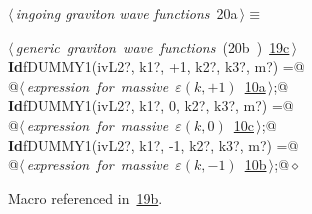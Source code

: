 \documentclass[a4paper,12pt]{amsart}
\renewcommand{\NWtarget}[2]{\hypertarget{#1}{#2}}
\renewcommand{\NWlink}[2]{\hyperlink{#1}{#2}}
\renewcommand{\NWtxtMacroRefIn}{Macro referenced in}
\renewcommand{\NWsep}{${\diamond}$}
\begin{document}
\begin{flushleft} \small
\begin{minipage}{\linewidth}\label{scrap42}\raggedright\small
\NWtarget{nuweb20a}{} $\langle\,${\itshape ingoing graviton wave functions}\nobreak\ {\footnotesize {20a}}$\,\rangle\equiv$
\vspace{-1ex}
\begin{list}{}{} \item
\mbox{}\verb@@\hbox{$\langle\,${\itshape generic graviton wave functions}\nobreak\ ({\footnotesize 20b\label{scrap43}
 }\mbox{}\verb@inp@ ) {\footnotesize \NWlink{nuweb19c}{19c}}$\,\rangle$}\verb@@\\
\mbox{}\verb@@\hbox{\sffamily\bfseries Id}\verb@ fDUMMY1(ivL2?, k1?, +1, k2?, k3?, m?) =@\\
\mbox{}\verb@   @\hbox{$\langle\,${\itshape expression for massive $\varepsilon(k, +1)$}\nobreak\ {\footnotesize \NWlink{nuweb10a}{10a}}$\,\rangle$}\verb@;@\\
\mbox{}\verb@@\hbox{\sffamily\bfseries Id}\verb@ fDUMMY1(ivL2?, k1?, 0, k2?, k3?, m?) =@\\
\mbox{}\verb@   @\hbox{$\langle\,${\itshape expression for massive $\varepsilon(k, 0)$}\nobreak\ {\footnotesize \NWlink{nuweb10c}{10c}}$\,\rangle$}\verb@;@\\
\mbox{}\verb@@\hbox{\sffamily\bfseries Id}\verb@ fDUMMY1(ivL2?, k1?, -1, k2?, k3?, m?) =@\\
\mbox{}\verb@   @\hbox{$\langle\,${\itshape expression for massive $\varepsilon(k, -1)$}\nobreak\ {\footnotesize \NWlink{nuweb10b}{10b}}$\,\rangle$}\verb@;@{\NWsep}
\end{list}
\vspace{-1.5ex}
\footnotesize
\begin{list}{}{\setlength{\itemsep}{-\parsep}\setlength{\itemindent}{-\leftmargin}}
\item \NWtxtMacroRefIn\ \NWlink{nuweb19b}{19b}.

\item{}
\end{list}
\end{minipage}\vspace{4ex}
\end{flushleft}
\end{document}
